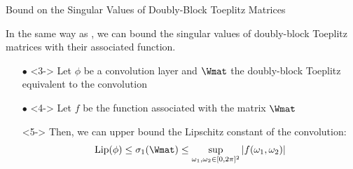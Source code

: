 \begin{frame}{Bound on the Singular Values of Doubly-Block Toeplitz Matrices}

  In the same way as {}, we can bound the singular values of doubly-block Toeplitz matrices with their associated function.


  \begin{itemize}
    \item[$\bullet$] <3-> Let $\phi$ be a convolution layer and $\Wmat$ the doubly-block Toeplitz equivalent to the convolution
    \item[$\bullet$] <4-> Let $f$ be the function associated with the matrix $\Wmat$
    \item[\orange{$\rightarrow$}] <5-> Then, we can upper bound the Lipschitz constant of the convolution:
      \begin{equation}
        \lip(\phi) \leq \sigma_1(\Wmat) \leq \sup_{\omega_1, \omega_2 \in [0, 2\pi]^2} |f(\omega_1,\omega_2)|
      \end{equation}
   \end{itemize}


\end{frame}


